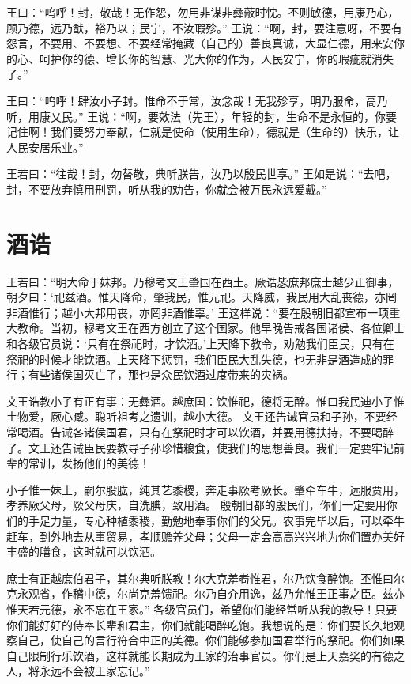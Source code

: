 \documentclass[a4paper,12pt,UTF8,twoside]{ctexbook}
\begin{document}
王曰：“呜呼！封，敬哉！无作怨，勿用非谋非彝蔽时忱。丕则敏德，用康乃心，顾乃德，远乃猷，裕乃以；民宁，不汝瑕殄。”
王说：“啊，封，要注意呀，不要有怨言，不要用、不要想、不要经常掩藏（自己的）善良真诚，大显仁德，用来安你的心、呵护你的德、增长你的智慧、光大你的作为，人民安宁，你的瑕疵就消失了。”

王曰：“呜呼！肆汝小子封。惟命不于常，汝念哉！无我殄享，明乃服命，高乃听，用康乂民。”
王说：“啊，要效法（先王），年轻的封，生命不是永恒的，你要记住啊！我们要努力奉献，仁就是使命（使用生命），德就是（生命的）快乐，让人民安居乐业。”

王若曰：“往哉！封，勿替敬，典听朕告，汝乃以殷民世享。”
王如是说：“去吧，封，不要放弃慎用刑罚，听从我的劝告，你就会被万民永远爱戴。”

\chapter{酒诰}

王若曰：“明大命于妹邦。乃穆考文王肇国在西土。厥诰毖庶邦庶士越少正御事，朝夕曰：‘祀兹酒。惟天降命，肇我民，惟元祀。天降威，我民用大乱丧德，亦罔非酒惟行；越小大邦用丧，亦罔非酒惟辜。’
王这样说：“要在殷朝旧都宣布一项重大教命。当初，穆考文王在西方创立了这个国家。他早晚告戒各国诸侯、各位卿士和各级官员说：‘只有在祭祀时，才饮酒。’上天降下教令，劝勉我们臣民，只有在祭祀的时候才能饮酒。上天降下惩罚，我们臣民大乱失德，也无非是酒造成的罪行；有些诸侯国灭亡了，那也是众民饮酒过度带来的灾祸。

文王诰教小子有正有事：无彝酒。越庶国：饮惟祀，德将无醉。惟曰我民迪小子惟土物爱，厥心臧。聪听祖考之遗训，越小大德。
文王还告诫官员和子孙，不要经常喝酒。告诫各诸侯国君，只有在祭祀时才可以饮酒，并要用德扶持，不要喝醉了。文王还告诫臣民要教导子孙珍惜粮食，使我们的思想善良。我们一定要牢记前辈的常训，发扬他们的美德！

小子惟一妹土，嗣尔股肱，纯其艺黍稷，奔走事厥考厥长。肇牵车牛，远服贾用，孝养厥父母，厥父母庆，自洗腆，致用酒。
殷朝旧都的殷民们，你们一定要用你们的手足力量，专心种植黍稷，勤勉地奉事你们的父兄。农事完毕以后，可以牵牛赶车，到外地去从事贸易，孝顺赡养父母；父母一定会高高兴兴地为你们置办美好丰盛的膳食，这时就可以饮酒。

庶士有正越庶伯君子，其尔典听朕教！尔大克羞耇惟君，尔乃饮食醉饱。丕惟曰尔克永观省，作稽中德，尔尚克羞馈祀。尔乃自介用逸，兹乃允惟王正事之臣。兹亦惟天若元德，永不忘在王家。”
各级官员们，希望你们能经常听从我的教导！只要你们能好好的侍奉长辈和君主，你们就能喝醉吃饱。我想说的是：你们要长久地观察自己，使自己的言行符合中正的美德。你们能够参加国君举行的祭祀。你们如果自己限制行乐饮酒，这样就能长期成为王家的治事官员。你们是上天嘉奖的有德之人，将永远不会被王家忘记。”
\end{document}
